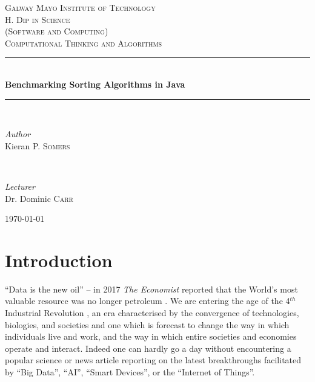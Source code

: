 \documentclass[12pt,a4paper]{article}
\begin{document}
\begin{titlepage} %
	\newcommand{\HRule}{\rule{\linewidth}{0.5mm}} %
	
	\center
	\textsc{\LARGE Galway Mayo Institute of Technology}\\[1.5cm] 
	\textsc{\Large H. Dip in Science \\(Software and Computing)}\\[0.5cm] %
	\textsc{\large Computational Thinking and Algorithms}\\[0.5cm] %
	\HRule\\[0.4cm]
	
	{\huge\bfseries Benchmarking Sorting Algorithms in Java}\\[0.4cm] %
	
	\HRule\\[1.5cm]
	\begin{minipage}{0.4\textwidth}
		\begin{flushleft}
			\large
			\textit{Author}\\
			Kieran P. \textsc{Somers} %
		\end{flushleft}
	\end{minipage}
	~
	\begin{minipage}{0.4\textwidth}
		\begin{flushright}
			\large
			\textit{Lecturer}\\
			Dr. Dominic \textsc{Carr} %
		\end{flushright}
	\end{minipage}

	\vfill\vfill\vfill %
	
	{\large\today} %
	\vfill %
	
\end{titlepage}

\section{Introduction}
``Data is the new oil'' -- in 2017 \emph{The Economist} reported that the World's most valuable resource was no longer petroleum \cite{economist, bhageshpur_council_nodate}. We are entering the age of the 4$^{th}$ Industrial Revolution \cite{schwab_fourth_2016}, an era characterised by the convergence of technologies, biologies, and societies and one which is forecast to change the way in which individuals live and work, and the way in which entire societies and economies operate and interact. Indeed one can hardly go a day without encountering a popular science or news article reporting on the latest breakthroughs facilitated by ``Big Data'', ``AI'', ``Smart Devices'', or the ``Internet of Things''. 
\end{document}
